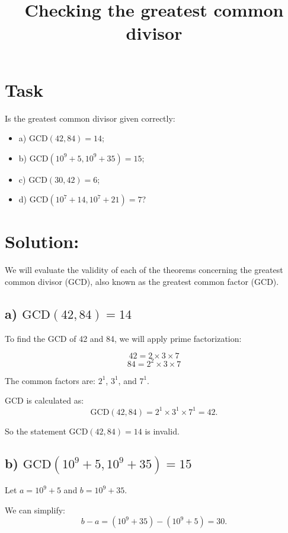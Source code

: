 \documentclass{article}
\begin{document}
\title{Checking the greatest common divisor}
\author{}
\date{}
\maketitle

\section*{Task}

Is the greatest common divisor given correctly:
\begin{itemize}
\item a) \( \text{GCD}(42, 84) = 14 \);
\item b) \( \text{GCD}(10^9 + 5, 10^9 + 35) = 15 \);
\item c) \( \text{GCD}(30, 42) = 6 \);
\item d) \( \text{GCD}(10^7 + 14, 10^7 + 21) = 7 \)? \end{itemize}

\section*{Solution:}

We will evaluate the validity of each of the theorems concerning the greatest common divisor (GCD), also known as the greatest common factor (GCD).

\subsection*{a) \( \text{GCD}(42, 84) = 14 \)}

To find the GCD of 42 and 84, we will apply prime factorization:

\[
42 = 2 \times 3 \times 7
\]
\[
84 = 2^2 \times 3 \times 7
\]

The common factors are: \( 2^1 \), \( 3^1 \), and \( 7^1 \).

GCD is calculated as:
\[
\text{GCD}(42, 84) = 2^1 \times 3^1 \times 7^1 = 42.
\]

So the statement \( \text{GCD}(42, 84) = 14 \) is invalid.

\subsection*{b) \( \text{GCD}(10^9 + 5, 10^9 + 35) = 15 \)}

Let \( a = 10^9 + 5 \) and \( b = 10^9 + 35 \).

We can simplify:
\[
b - a = (10^9 + 35) - (10^9 + 5) = 30.
\]
\end{document}

